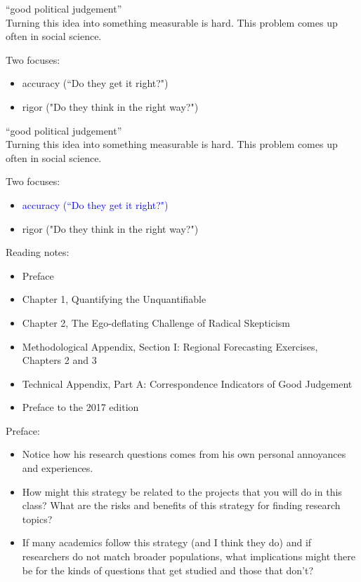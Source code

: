 \documentclass[aspectratio=169]{beamer}
\begin{document}
\begin{frame}

``good political judgement''\\
\pause
Turning this idea into something measurable is hard.  This problem comes up often in social science.

\pause
Two focuses:
\begin{itemize}
\item accuracy (``Do they get it right?") 
\item rigor ("Do they think in the right way?")
\end{itemize}

\end{frame}
\begin{frame}

``good political judgement''\\
Turning this idea into something measurable is hard.  This problem comes up often in social science.

Two focuses:
\begin{itemize}
\item \textcolor{blue}{accuracy (``Do they get it right?")}
\item rigor ("Do they think in the right way?")
\end{itemize}

\end{frame}
\begin{frame}

Reading notes:
\begin{itemize}
\item Preface
\item Chapter 1, Quantifying the Unquantifiable
\item Chapter 2, The Ego-deflating Challenge of Radical Skepticism
\item Methodological Appendix, Section I: Regional Forecasting Exercises, Chapters 2 and 3
\item Technical Appendix, Part A: Correspondence Indicators of Good Judgement
\item Preface to the 2017 edition
\end{itemize}

\end{frame}
\begin{frame}

Preface:
\begin{itemize}
\item Notice how his research questions comes from his own personal annoyances and experiences.
\pause
\item How might this strategy be related to the projects that you will do in this class? What are the risks and benefits of this strategy for finding research topics?
\pause
\item If many academics follow this strategy (and I think they do) and if researchers do not match broader populations, what implications might there be for the kinds of questions that get studied and those that don't?
\end{itemize}

\end{frame}
\end{document}
